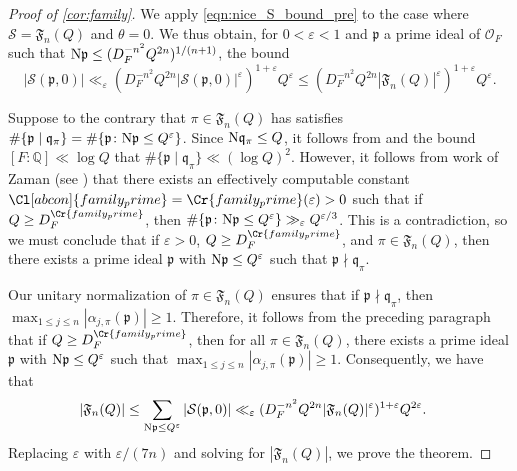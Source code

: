 \documentclass[11pt]{amsart}
\theoremstyle{remark}
\numberwithin{equation}{section}
\newcommand{\kp}{\mathfrak{p}}
\newcommand{\kq}{\mathfrak{q}}
\newcommand{\N}{\textnormal{N}}
\newcommand{\Q}{\mathbb{Q}}
\renewcommand{\epsilon}{\varepsilon}
\begin{document}
\begin{proof}[Proof of \cref{cor:family}]
We apply \eqref{eqn:nice_S_bound_pre} to the case where $\mathcal{S}=\mathfrak{F}_n(Q)$ and $\theta=0$.  We thus obtain, for $0<\epsilon<1$ and $\kp$ a prime ideal of $\mathcal{O}_F$ such that $\N\kp\leq (D_F^{-n^2}Q^{2n})^{1/(n+1)}$, the bound
\[
|\mathcal{S}(\kp,0)|\ll_{\epsilon}(D_F^{-n^2}Q^{2n}|\mathcal{S}(\kp,0)|^{\epsilon})^{1+\epsilon}Q^{\epsilon}\leq (D_F^{-n^2}Q^{2n}|\mathfrak{F}_n(Q)|^{\epsilon})^{1+\epsilon}Q^{\epsilon}.
\]

Suppose to the contrary that $\pi\in\mathfrak{F}_n(Q)$ has satisfies $\#\{\kp\mid\kq_{\pi}\}=\#\{\kp\colon \N\kp\leq Q^{\epsilon}\}$.  Since $\N\kq_{\pi}\leq Q$, it follows from \cite[Lemma 7.3]{ThornerZhuo} and the bound $[F:\Q]\ll \log Q$ that $\#\{\kp\mid\kq_{\pi}\}\ll (\log Q)^2$.  However, it follows from work of Zaman (see \cite[Theorem 1.3.1]{Zaman_Thesis}) that there exists an effectively computable constant $\Cl[abcon]{family_prime}=\Cr{family_prime}(\epsilon)>0$ such that if $Q\geq D_F^{\Cr{family_prime}}$, then $\#\{\kp\colon \N\kp\leq Q^{\epsilon}\}\gg_{\epsilon} Q^{\epsilon/3}$.  This is a contradiction, so we must conclude that if $\epsilon>0$, $Q\geq  D_F^{\Cr{family_prime}}$, and $\pi\in\mathfrak{F}_n(Q)$, then there exists a prime ideal $\kp$ with $\N\kp\leq Q^{\epsilon}$ such that $\kp\nmid \kq_{\pi}$.

Our unitary normalization of $\pi\in\mathfrak{F}_n(Q)$ ensures that if $\kp\nmid\kq_{\pi}$, then $\max_{1\leq j\leq n}|\alpha_{j,\pi}(\kp)|\geq 1$.  Therefore, it follows from the preceding paragraph that if $Q\geq D_F^{\Cr{family_prime}}$, then for all $\pi\in\mathfrak{F}_n(Q)$, there exists a prime ideal $\kp$ with $\N\kp\leq Q^{\epsilon}$ such that $\max_{1\leq j\leq n}|\alpha_{j,\pi}(\kp)|\geq 1$.  Consequently, we have that
\begin{align*}
|\mathfrak{F}_n(Q)|&\leq \sum_{\N\kp\leq Q^{\epsilon}}|\mathcal{S}(\kp,0)|\ll_{\epsilon}(D_F^{-n^2}Q^{2n}|\mathfrak{F}_n(Q)|^{\epsilon})^{1+\epsilon}Q^{2\epsilon}.
\end{align*}
Replacing $\epsilon$ with $\epsilon/(7n)$ and solving for $|\mathfrak{F}_n(Q)|$, we prove the theorem.
\end{proof}
\end{document}
